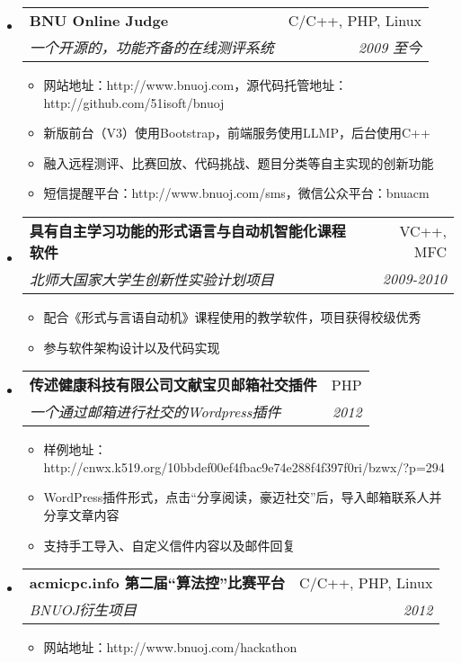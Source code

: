 \documentclass[letterpaper,11pt,UTF8,nofonts]{ctexart}
\makeatletter
\newcommand{\resitem}[1]{\item #1 \vspace{-2pt}}
\newcommand{\ressubheading}[4]{

\begin{tabular*}{6.5in}{l@{\cftdotfill{\cftsecdotsep}\extracolsep{\fill}}r}

		\textbf{#1} & #2 \\

		\textit{#3} & \textit{#4} \\

\end{tabular*}\vspace{-6pt}}
\makeatother
\begin{document}
\begin{itemize}

\item \ressubheading{BNU Online Judge}{C/C++, PHP, Linux}{一个开源的，功能齐备的在线测评系统}{2009 至今}

  \begin{itemize}

    \resitem{网站地址：http://www.bnuoj.com，源代码托管地址：http://github.com/51isoft/bnuoj}

    \resitem{新版前台（V3）使用Bootstrap，前端服务使用LLMP，后台使用C++}

    \resitem{融入远程测评、比赛回放、代码挑战、题目分类等自主实现的创新功能}

    \resitem{短信提醒平台：http://www.bnuoj.com/sms，微信公众平台：bnuacm}

	\end{itemize}

\item \ressubheading{具有自主学习功能的形式语言与自动机智能化课程软件}{VC++, MFC}{北师大国家大学生创新性实验计划项目}{2009-2010}

\begin{itemize}

    \resitem{配合《形式与言语自动机》课程使用的教学软件，项目获得校级优秀}

    \resitem{参与软件架构设计以及代码实现}

    \end{itemize}

\item \ressubheading{传述健康科技有限公司文献宝贝邮箱社交插件}{PHP}{一个通过邮箱进行社交的Wordpress插件}{2012}

\begin{itemize}

    \resitem{样例地址：http://cnwx.k519.org/10bbdef00ef4fbac9e74e288f4f397f0ri/bzwx/?p=294}

    \resitem{WordPress插件形式，点击“分享阅读，豪迈社交”后，导入邮箱联系人并分享文章内容}

    \resitem{支持手工导入、自定义信件内容以及邮件回复}

    \end{itemize}

\item \ressubheading{acmicpc.info 第二届“算法控”比赛平台}{C/C++, PHP, Linux}{BNUOJ衍生项目}{2012}

  \begin{itemize}

    \resitem{网站地址：http://www.bnuoj.com/hackathon}


\end{itemize}
\end{itemize}
\end{document}
